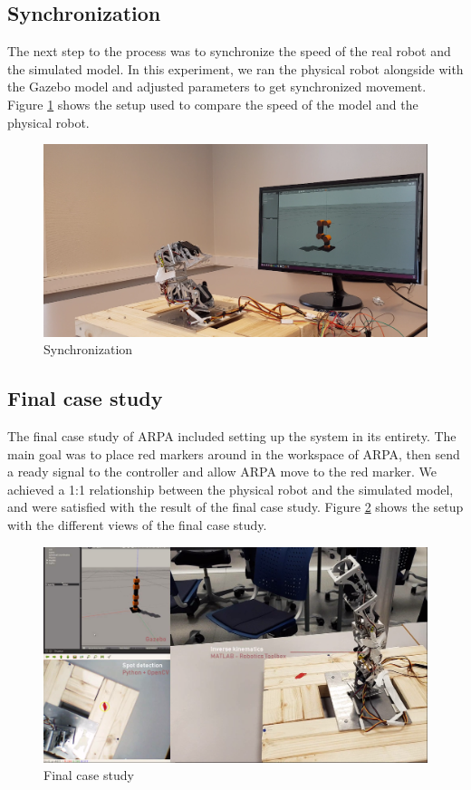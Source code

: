 \documentclass[11pt,a4paper, titlepage]{article}
\begin{document}
	\subsection{Synchronization}
	The next step to the process was to synchronize the speed of the real robot and the simulated model. In this experiment, we ran the physical robot alongside with the Gazebo model and adjusted parameters to get synchronized movement. Figure \ref{synch} shows the setup used to compare the speed of the model and the physical robot. 
	
	\begin{figure}[H]
		\centering
		\includegraphics[width=\linewidth]{../Diagrams/Synchronizing.png}
		\caption{Synchronization}
		\label{synch}
	\end{figure}
	
	
	\subsection{Final case study}
	The final case study of ARPA included setting up the system in its entirety. The main goal was to place red markers around in the workspace of ARPA, then send a ready signal to the controller and allow ARPA move to the red marker. We achieved a 1:1 relationship between the physical robot and the simulated model, and were satisfied with the result of the final case study. Figure \ref{fig:three-split} shows the setup with the different views of the final case study.
	\begin{figure}[H]
		\centering
		\includegraphics[width=\linewidth]{../Diagrams/ThreeSplit.png}
		\caption{Final case study}
		\label{fig:three-split}
	\end{figure}
	
\end{document}

